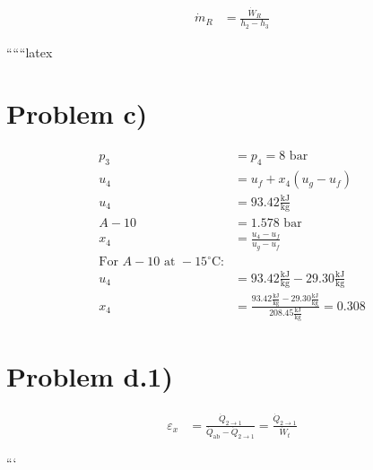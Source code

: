 \begin{align*}
    \dot{m}_R &= \frac{\dot{W}_R}{h_2 - h_3}
\end{align*}

``````latex


\section*{Problem c)}

\begin{align*}
    p_3 &= p_4 = 8 \text{ bar} \\
    u_4 &= u_f + x_4 (u_g - u_f) \\
    u_4 &= 93.42 \frac{\text{kJ}}{\text{kg}} \\
    A-10 &= 1.578 \text{ bar} \\
    x_4 &= \frac{u_4 - u_f}{u_g - u_f} \\
    \text{For } A-10 \text{ at } -15^\circ \text{C:} \\
    u_4 &= 93.42 \frac{\text{kJ}}{\text{kg}} - 29.30 \frac{\text{kJ}}{\text{kg}} \\
    x_4 &= \frac{93.42 \frac{\text{kJ}}{\text{kg}} - 29.30 \frac{\text{kJ}}{\text{kg}}}{208.45 \frac{\text{kJ}}{\text{kg}}} = 0.308
\end{align*}

\section*{Problem d.1)}

\begin{align*}
    \varepsilon_x &= \frac{\dot{Q}_{2\to1}}{\dot{Q}_{\text{ab}} - \dot{Q}_{2\to1}} = \frac{\dot{Q}_{2\to1}}{\dot{W}_{t}}
\end{align*}

```